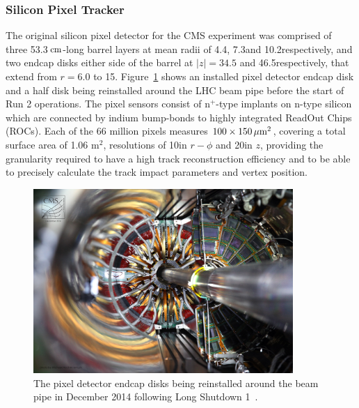 

\subsubsection{Silicon Pixel Tracker}
The original silicon pixel detector for the CMS experiment was comprised of three 53.3$\,\text{cm}$-long barrel layers at mean radii of 4.4\cm, 7.3\cm and 10.2\cm respectively, and two endcap disks either side of the barrel at $|z| = 34.5$ and 46.5\cm respectively, that extend from $r = 6.0$ to 15\cm.
Figure~\ref{fig:pixel} shows an installed pixel detector endcap disk and a half disk being reinstalled around the LHC beam pipe before the start of Run 2 operations.
The pixel sensors consist of n$^{+}$-type implants on n-type silicon which are connected by indium bump-bonds to highly integrated ReadOut Chips (ROCs).
Each of the 66 million pixels measures $100 \times 150\,\mu\text{m}^{2}$, covering a total surface area of 1.06 m$^{2}$, resolutions of 10\mum in $r-\phi$ and 20\mum in $z$, providing the granularity required to have a high track reconstruction efficiency and to be able to precisely calculate the track impact parameters and vertex position.

\begin{figure}[htbp]
\begin{center}
\vspace*{2mm}\includegraphics[width=0.88\textwidth]{figs/cms/a194Ts.jpg}
\vspace*{1mm}\caption{The pixel detector endcap disks being reinstalled around the beam pipe in December 2014 following Long Shutdown 1~\cite{Hoch:1977415}.}
\label{fig:pixel}
\end{center}
\end{figure}

